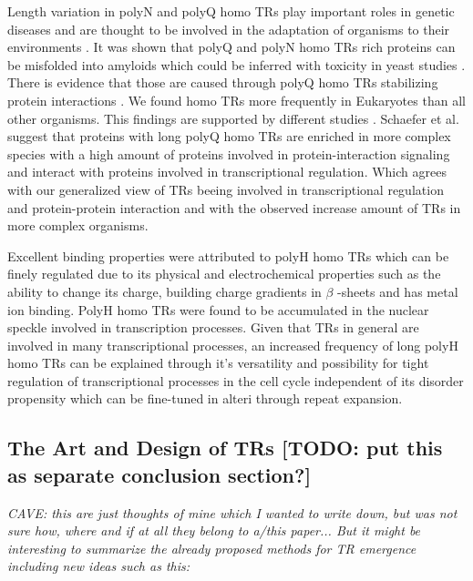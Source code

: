 \documentclass[a4,center,fleqn]{NAR}
\begin{document}
Length variation in polyN and polyQ homo TRs play important roles in genetic diseases and are thought to be involved in the adaptation of organisms to their environments \cite{Caprioli2012, Undurraga2012, Michael2007}.
It was shown that polyQ and polyN homo TRs rich proteins can be misfolded into amyloids which could be inferred with toxicity in yeast studies \cite{Kochneva2012, Alexandrov2013, Gong2012}. 
There is evidence that those are caused through polyQ homo TRs stabilizing protein interactions \cite{Schaefer2012}.
We found homo TRs more frequently in Eukaryotes than all other organisms. This findings are supported by different studies \cite{Schaefer2012, Huntley2002}.
Schaefer et al. \cite{Schaefer2012} suggest that proteins with long polyQ homo TRs are enriched in more complex species with a high amount of proteins involved in protein-interaction signaling and interact with proteins involved in transcriptional regulation. Which agrees with our generalized view of TRs beeing involved in transcriptional regulation and protein-protein interaction and with the observed increase amount of TRs in more complex organisms.

Excellent binding properties were attributed to polyH homo TRs \cite{Salichs2009} which can be finely regulated due to its physical and electrochemical properties such as the ability to change its charge, building charge gradients in $\beta$ -sheets and has metal ion binding. PolyH homo TRs were found to be accumulated in the nuclear speckle involved in transcription processes.
Given that TRs in general are involved in many transcriptional processes, an increased frequency of long polyH homo TRs can be explained through it's versatility and possibility for tight regulation of transcriptional processes in the cell cycle independent of its disorder propensity which can be fine-tuned in alteri through repeat expansion.

\subsection{The Art and Design of TRs [TODO: put this as separate conclusion section?]}
\textit{CAVE: this are just thoughts of mine which I wanted to write down, but was not sure how, where and if at all they belong to a/this paper... But it might be interesting to summarize the already proposed methods for TR emergence including new ideas such as this:}
\end{document}
